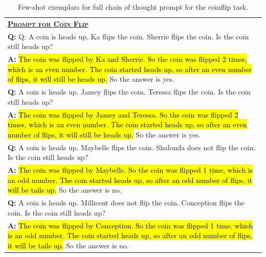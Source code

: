 \begingroup
\begin{table}[H]
    \caption{
    Few-shot exemplars for full chain of thought prompt for the coinflip task.
    }
    \centering
    \small
    \begin{tabular}{p{\linewidth}}
        \toprule
        \underline{\textbf{\textsc{Prompt for Coin Flip}}} \\
        \vspace{-2mm}
        \textbf{Q:} Q: A coin is heads up. Ka flips the coin. Sherrie flips the coin. Is the coin still heads up? \\
        \vspace{-1mm}
        \textbf{A:} \hl{The coin was flipped by Ka and Sherrie. So the coin was flipped 2 times, which is an even number. The coin started heads up, so after an even number of flips, it will still be heads up.} So the answer is yes. \\
        \vspace{0mm}
        \textbf{Q:} A coin is heads up. Jamey flips the coin. Teressa flips the coin. Is the coin still heads up? \\
        \vspace{-1mm}
        \textbf{A:} \hl{The coin was flipped by Jamey and Teressa. So the coin was flipped 2 times, which is an even number. The coin started heads up, so after an even number of flips, it will still be heads up.} So the answer is yes. \\
        \vspace{0mm}
        \textbf{Q:} A coin is heads up. Maybelle flips the coin. Shalonda does not flip the coin. Is the coin still heads up? \\
        \vspace{-1mm}
        \textbf{A:} \hl{The coin was flipped by Maybelle. So the coin was flipped 1 time, which is an odd number. The coin started heads up, so after an odd number of flips, it will be tails up.} So the answer is no. \\
        \vspace{0mm}
        \textbf{Q:} A coin is heads up. Millicent does not flip the coin. Conception flips the coin. Is the coin still heads up? \\
        \vspace{-1mm}
        \textbf{A:} \hl{The coin was flipped by Conception. So the coin was flipped 1 time, which is an odd number. The coin started heads up, so after an odd number of flips, it will be tails up.} So the answer is no. \\

\end{tabular}
\end{table}
